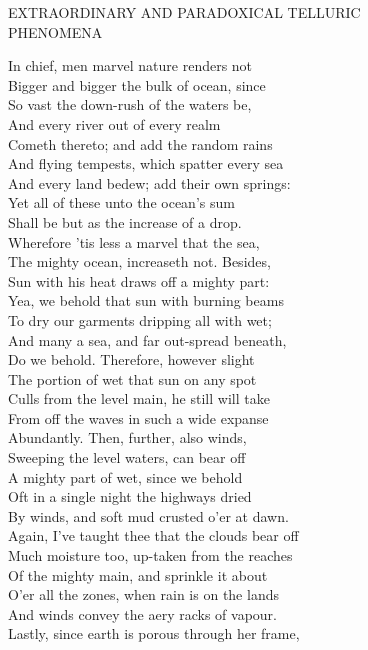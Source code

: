 EXTRAORDINARY AND PARADOXICAL TELLURIC\\
PHENOMENA

In chief, men marvel nature renders not\\
Bigger and bigger the bulk of ocean, since\\
So vast the down-rush of the waters be,\\
And every river out of every realm\\
Cometh thereto; and add the random rains\\
And flying tempests, which spatter every sea\\
And every land bedew; add their own springs:\\
Yet all of these unto the ocean's sum\\
Shall be but as the increase of a drop.\\
Wherefore 'tis less a marvel that the sea,\\
The mighty ocean, increaseth not. Besides,\\
Sun with his heat draws off a mighty part:\\
Yea, we behold that sun with burning beams\\
To dry our garments dripping all with wet;\\
And many a sea, and far out-spread beneath,\\
Do we behold. Therefore, however slight\\
The portion of wet that sun on any spot\\
Culls from the level main, he still will take\\
From off the waves in such a wide expanse\\
Abundantly. Then, further, also winds,\\
Sweeping the level waters, can bear off\\
A mighty part of wet, since we behold\\
Oft in a single night the highways dried\\
By winds, and soft mud crusted o'er at dawn.\\
Again, I've taught thee that the clouds bear off\\
Much moisture too, up-taken from the reaches\\
Of the mighty main, and sprinkle it about\\
O'er all the zones, when rain is on the lands\\
And winds convey the aery racks of vapour.\\
Lastly, since earth is porous through her frame,\\

